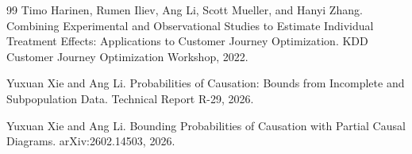 \documentclass{article}
\begin{document}
\begin{thebibliography}{99}
   Timo Harinen, Rumen Iliev, Ang Li, Scott Mueller, and Hanyi Zhang. Combining Experimental and Observational Studies to Estimate Individual Treatment Effects: Applications to Customer Journey Optimization. KDD Customer Journey Optimization Workshop, 2022.

   Yuxuan Xie and Ang Li. Probabilities of Causation: Bounds from Incomplete and Subpopulation Data. Technical Report R-29, 2026.

   Yuxuan Xie and Ang Li. Bounding Probabilities of Causation with Partial Causal Diagrams. arXiv:2602.14503, 2026.

\end{thebibliography}
\end{document}
